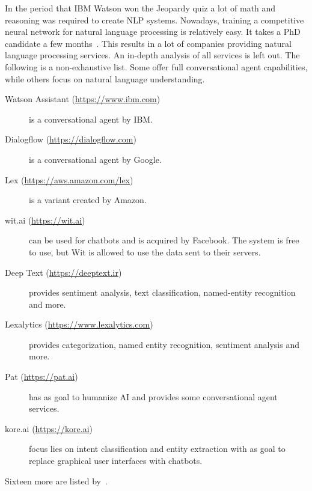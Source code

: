 In the period that IBM Watson won the Jeopardy quiz a lot of math and reasoning was required to create NLP systems.
Nowadays, training a competitive neural network for natural language processing is relatively easy.
It takes a PhD candidate a few months~\citep{manning2017lectures}.
This results in a lot of companies providing natural language processing services.
An in-depth analysis of all services is left out.
The following is a non-exhaustive list.
Some offer full conversational agent capabilities, while others focus on natural language understanding.
\begin{description}
    \item [Watson Assistant (\url{https://www.ibm.com})] is a conversational agent by IBM.
    \item [Dialogflow (\url{https://dialogflow.com})] is a conversational agent by Google.
    \item [Lex (\url{https://aws.amazon.com/lex})] is a variant created by Amazon.
    \item [wit.ai (\url{https://wit.ai})] can be used for chatbots and is acquired by Facebook.
    The system is free to use, but Wit is allowed to use the data sent to their servers.
    \item [Deep Text (\url{https://deeptext.ir})] provides sentiment analysis, text classification, named-entity recognition and more.
    \item [Lexalytics (\url{https://www.lexalytics.com})] provides categorization, named entity recognition, sentiment analysis and more.
    \item [Pat (\url{https://pat.ai})] has as goal to humanize AI and provides some conversational agent services.
    \item [kore.ai (\url{https://kore.ai})] focus lies on intent classification and entity extraction with as goal to replace graphical user interfaces with chatbots.
\end{description}
Sixteen more are listed by~\citet{dale2018text}.
